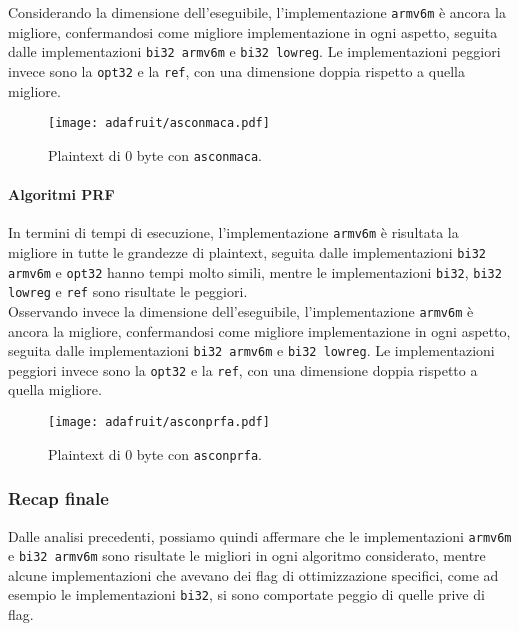 \noindent Considerando la dimensione dell'eseguibile, l'implementazione \texttt{armv6m} è ancora la migliore, confermandosi come migliore implementazione in ogni aspetto, seguita dalle implementazioni \texttt{bi32 armv6m} e \texttt{bi32 lowreg}. Le implementazioni peggiori invece sono la \texttt{opt32} e la \texttt{ref}, con una dimensione doppia rispetto a quella migliore.

\begin{figure}[H]
    \centering
    \texttt{[image: adafruit/asconmaca.pdf]}
    \caption{Plaintext di 0 byte con \texttt{asconmaca}.}
\end{figure}

\paragraph{Algoritmi PRF}

In termini di tempi di esecuzione, l'implementazione \texttt{armv6m} è risultata la migliore in tutte le grandezze di plaintext, seguita dalle implementazioni \texttt{bi32 armv6m} e \texttt{opt32} hanno tempi molto simili, mentre le implementazioni \texttt{bi32}, \texttt{bi32 lowreg} e \texttt{ref} sono risultate le peggiori. \\

\noindent Osservando invece la dimensione dell'eseguibile, l'implementazione \texttt{armv6m} è ancora la migliore, confermandosi come migliore implementazione in ogni aspetto, seguita dalle implementazioni \texttt{bi32 armv6m} e \texttt{bi32 lowreg}. Le implementazioni peggiori invece sono la \texttt{opt32} e la \texttt{ref}, con una dimensione doppia rispetto a quella migliore.

\begin{figure}[H]
    \centering
    \texttt{[image: adafruit/asconprfa.pdf]}
    \caption{Plaintext di 0 byte con \texttt{asconprfa}.}
\end{figure}

\subsubsection{Recap finale}

Dalle analisi precedenti, possiamo quindi affermare che le implementazioni \texttt{armv6m} e \texttt{bi32 armv6m} sono risultate le migliori in ogni algoritmo considerato, mentre alcune implementazioni che avevano dei flag di ottimizzazione specifici, come ad esempio le implementazioni \texttt{bi32}, si sono comportate peggio di quelle prive di flag.

